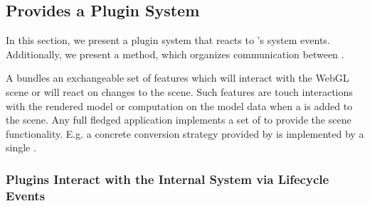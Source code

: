 \documentclass[../ClassicThesis.tex]{subfiles}
\begin{document}



\subsection{{\convertify} Provides a Plugin System}
\label{sec:plugin-system}


In this section, we present a plugin system that reacts to
{\convertify}'s system events. Additionally, we present a
method, which organizes communication between
.


A  bundles an exchangeable set of features
which will interact with the WebGL scene or will react on
changes to the scene. Such features are touch interactions
with the rendered model or computation on the model data
when a  is added to the scene. Any full fledged
application implements a set of  to provide
the scene functionality. E.g. a concrete conversion strategy
provided by {\platener} is implemented by a single
.

\subsubsection{Plugins Interact with the Internal System via
  Lifecycle Events}

\end{document}
